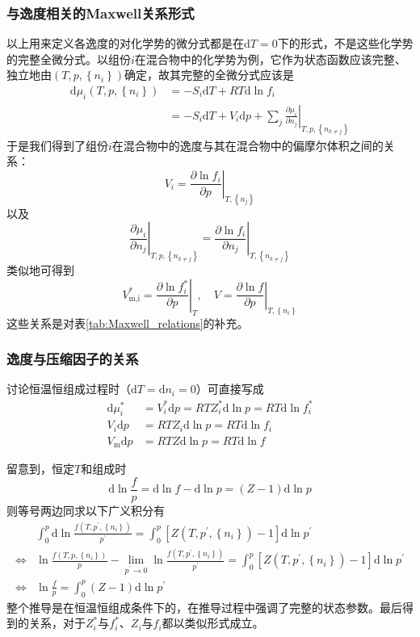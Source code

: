 \documentclass[main.tex]{subfiles}
\begin{document}
\subsubsection{与逸度相关的Maxwell关系形式}
以上用来定义各逸度的对化学势的微分式都是在$\mathrm{d}T=0$下的形式，不是这些化学势的完整全微分式。以组份$i$在混合物中的化学势为例，它作为状态函数应该完整、独立地由$\left(T,p,\left\{n_i\right\}\right)$确定，故其完整的全微分式应该是
\begin{align*}
  \mathrm{d}\mu_i\left(T,p,\left\{n_i\right\}\right) & =-S_i\mathrm{d}T+RT\mathrm{d}\ln f_i                                                                                   \\
                                                     & =-S_i\mathrm{d}T+V_i\mathrm{d}p+\sum_j\left.\frac{\partial\mu_i}{\partial n_j}\right|_{T,p,\left\{n_{k\neq j}\right\}}
\end{align*}
于是我们得到了组份$i$在混合物中的逸度与其在混合物中的偏摩尔体积之间的关系：
\[V_i=\left.\frac{\partial\ln f_i}{\partial p}\right|_{T,\left\{n_j\right\}}\]
以及
\[\left.\frac{\partial\mu_i}{\partial n_j}\right|_{T,p,\left\{n_{k\neq j}\right\}}=\left.\frac{\partial\ln f_i}{\partial n_j}\right|_{T,\left\{n_{k\neq j}\right\}}\]
类似地可得到
\[V_\text{m,i}^*=\left.\frac{\partial\ln f_i^*}{\partial p}\right|_T,\quad V=\left.\frac{\partial\ln f}{\partial p}\right|_{T,\left\{n_i\right\}}\]
这些关系是对表\ref{tab:Maxwell_relations}的补充。

\subsubsection{逸度与压缩因子的关系}
讨论恒温恒组成过程时（$\mathrm{d}T=\mathrm{d}n_i=0$）可直接写成
\begin{align*}
  \mathrm{d}\mu_i^*     & =V_i^*\mathrm{d}p=RTZ_i^*\mathrm{d}\ln p=RT\mathrm{d}\ln f_i^* \\
  V_i\mathrm{d}p        & =RTZ_i\mathrm{d}\ln p=RT\mathrm{d}\ln f_i                      \\
  V_\text{m}\mathrm{d}p & =RTZ\mathrm{d}\ln p=RT\mathrm{d}\ln f
\end{align*}

留意到，恒定$T$和组成时
\[\mathrm{d}\ln\frac{f}{p}=\mathrm{d}\ln f-\mathrm{d}\ln p=\left(Z-1\right)\mathrm{d}\ln p\]
则等号两边同求以下广义积分有
\begin{align*}
                  & \int_0^p\mathrm{d}\ln\frac{f\left(T,p^\prime,\left\{n_i\right\}\right)}{p^\prime}=\int_0^p\left[Z\left(T,p^\prime,\left\{n_i\right\}\right)-1\right]\mathrm{d}\ln p^\prime                                                     \\
  \Leftrightarrow & \ln\frac{f\left(T,p,\left\{n_i\right\}\right)}{p}-\lim_{p^\prime\to 0}\ln\frac{f\left(T,p^\prime,\left\{n_i\right\}\right)}{p^\prime}=\int_0^p\left[Z\left(T,p^\prime,\left\{n_i\right\}\right)-1\right]\mathrm{d}\ln p^\prime \\
  \Leftrightarrow & \ln\frac{f}{p}=\int_0^p\left(Z-1\right)\mathrm{d}\ln p^\prime
\end{align*}
整个推导是在恒温恒组成条件下的，在推导过程中强调了完整的状态参数。最后得到的关系，对于$Z_i^*$与$f_i^*$、$Z_i$与$f_i$都以类似形式成立。
\end{document}
